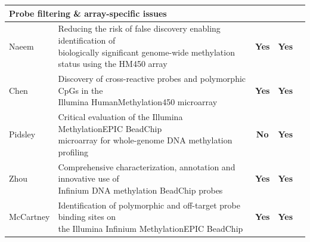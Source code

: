 \documentclass[10pt]{extarticle}
\newcommand{\yes}{\cellcolor{yesgreen}\textbf{Yes}}
\newcommand{\noo}{\cellcolor{nored}\textbf{No}}
\begin{document}
\begin{table}[H]
\begin{tabular}{|l|l|c|c|c|}
        \multicolumn{5}{|l|}{\cellcolor{catbg}\textbf{Probe filtering \& array-specific issues}} \\
        \hline

        Naeem &
        \makecell[l]{Reducing the risk of false discovery enabling identification of\\ biologically significant genome-wide methylation\\ status using the HM450 array} &
        \yes & \yes & \cite{Naeem2014} \\
        \hline

        Chen &
        \makecell[l]{Discovery of cross-reactive probes and polymorphic CpGs in the\\ Illumina HumanMethylation450 microarray} &
        \yes & \yes & \cite{Chen2013} \\
        \hline

        Pidsley &
        \makecell[l]{Critical evaluation of the Illumina MethylationEPIC BeadChip\\ microarray for whole-genome DNA methylation profiling} &
        \noo & \yes & \cite{Pidsley2016} \\
        \hline

        Zhou &
        \makecell[l]{Comprehensive characterization, annotation and innovative use of\\ Infinium DNA methylation BeadChip probes} &
        \yes & \yes & \cite{Zhou2016} \\
        \hline

        McCartney &
        \makecell[l]{Identification of polymorphic and off-target probe binding sites on\\ the Illumina Infinium MethylationEPIC BeadChip} &
        \yes & \yes & \cite{McCartney2016} \\
        \hline

    \end{tabular}
\end{table}
\end{document}
